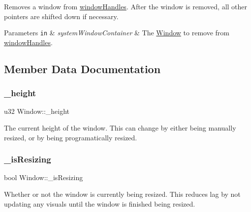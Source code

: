 Removes a window from \mbox{\hyperlink{_win32_window_8cpp_a0694e9af65d10d69624aa9a76b32cecd}{window\+Handles}}. After the window is removed, all other pointers are shifted down if necessary.


\begin{DoxyParams}[1]{Parameters}
\mbox{\tt in}  & {\em system\+Window\+Container} & The \mbox{\hyperlink{class_window}{Window}} to remove from \mbox{\hyperlink{_win32_window_8cpp_a0694e9af65d10d69624aa9a76b32cecd}{window\+Handles}}. \\
\hline
\end{DoxyParams}


\subsection{Member Data Documentation}
\mbox{\label{class_window_aaa83baf1f913b498d57cc1ff58b872c0}} 
\subsubsection{\texorpdfstring{\+\_\+height}{\_height}}
{\footnotesize\ttfamily u32 Window\+::\+\_\+height\hspace{0.3cm}{\ttfamily [private]}}

The current height of the window. This can change by either being manually resized, or by being programatically resized. \mbox{\label{class_window_a09e7ef3b8eadc8eb251447132997fc6b}} 
\subsubsection{\texorpdfstring{\+\_\+is\+Resizing}{\_isResizing}}
{\footnotesize\ttfamily bool Window\+::\+\_\+is\+Resizing\hspace{0.3cm}{\ttfamily [private]}}

Whether or not the window is currently being resized. This reduces lag by not updating any visuals until the window is finished being resized. \mbox{\label{class_window_ae3b7f41531e0e9dc71e5b1e2381a6123}} 

